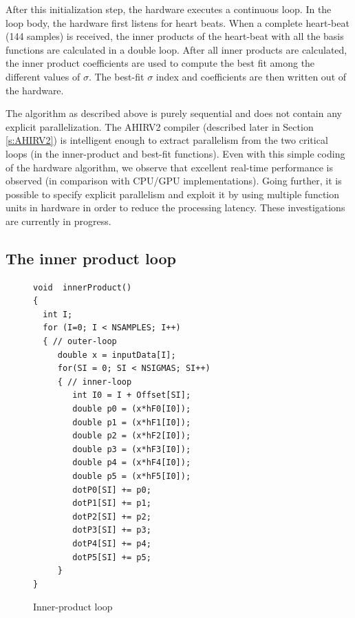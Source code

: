 \documentclass[conference]{IEEEtran}
\begin{document}
After this initialization step, the hardware executes a continuous loop.  
In the loop body, the hardware first listens for heart beats. When
a complete heart-beat (144 samples) is received, the inner products of the
heart-beat with all the basis functions are calculated in a double loop.  
After all inner products are calculated, the inner product coefficients
are used to compute the best fit among the different values of $\sigma$.
The best-fit $\sigma$ index and coefficients
are then written out of the hardware. 

The algorithm as described above is purely sequential
and does not contain any explicit parallelization.  The AHIRV2 compiler
(described later in Section \ref{s:AHIRV2}) is intelligent enough to extract 
parallelism from the two critical loops (in the inner-product and best-fit functions).
Even with this simple coding of the hardware algorithm,
we observe that excellent real-time performance
is observed (in comparison with CPU/GPU implementations).
Going further, it is possible to specify explicit parallelism %
and exploit it by using multiple function units in hardware
in order to reduce the processing latency.  These investigations
are currently in progress.



\subsection{The inner product loop} \label{sec:InnerProduct}

\begin{figure}
\begin{centering}
\small\begin{verbatim}
void  innerProduct()
{
  int I;
  for (I=0; I < NSAMPLES; I++)
  { // outer-loop
     double x = inputData[I];
     for(SI = 0; SI < NSIGMAS; SI++)
     { // inner-loop
        int I0 = I + Offset[SI];
        double p0 = (x*hF0[I0]);
        double p1 = (x*hF1[I0]);
        double p2 = (x*hF2[I0]);
        double p3 = (x*hF3[I0]);
        double p4 = (x*hF4[I0]);
        double p5 = (x*hF5[I0]);
        dotP0[SI] += p0;
        dotP1[SI] += p1;
        dotP2[SI] += p2;
        dotP3[SI] += p3;
        dotP4[SI] += p4;
        dotP5[SI] += p5;
     }
}
\end{verbatim}
\normalsize
\end{centering}
\caption{Inner-product loop}
\label{fig:InnerProduct}
\end{figure}
\end{document}
